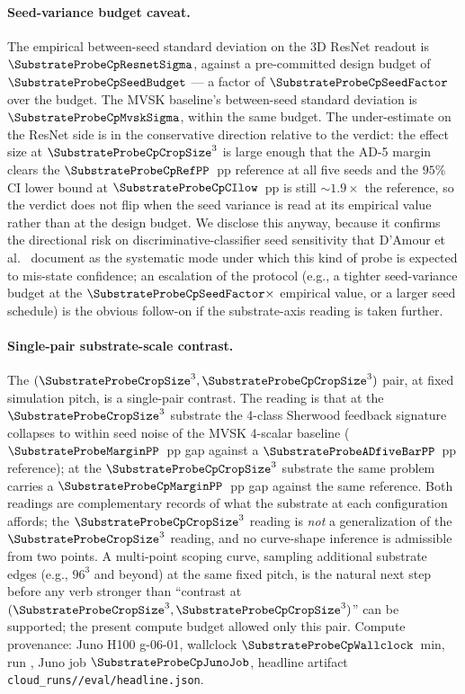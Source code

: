 \paragraph{Seed-variance budget caveat.}
The empirical between-seed standard deviation on the 3D ResNet readout is $\SubstrateProbeCpResnetSigma$, against a pre-committed design budget of $\SubstrateProbeCpSeedBudget$ --- a factor of $\SubstrateProbeCpSeedFactor$ over the budget. The MVSK baseline's between-seed standard deviation is $\SubstrateProbeCpMvskSigma$, within the same budget. The under-estimate on the ResNet side is in the conservative direction relative to the verdict: the effect size at $\SubstrateProbeCpCropSize^3$ is large enough that the AD-5 margin clears the $\SubstrateProbeCpRefPP$~pp reference at all five seeds and the $95\%$ CI lower bound at $\SubstrateProbeCpCIlow$~pp is still $\sim\!1.9\times$ the reference, so the verdict does not flip when the seed variance is read at its empirical value rather than at the design budget. We disclose this anyway, because it confirms the directional risk on discriminative-classifier seed sensitivity that D'Amour et al.~\cite{damour2020underspecification} document as the systematic mode under which this kind of probe is expected to mis-state confidence; an escalation of the protocol (e.g., a tighter seed-variance budget at the $\SubstrateProbeCpSeedFactor\times$ empirical value, or a larger seed schedule) is the obvious follow-on if the substrate-axis reading is taken further.

\paragraph{Single-pair substrate-scale contrast.}
The $(\SubstrateProbeCropSize^3, \SubstrateProbeCpCropSize^3)$ pair, at fixed simulation pitch, is a single-pair contrast. The reading is that at the $\SubstrateProbeCropSize^3$ substrate the 4-class Sherwood feedback signature collapses to within seed noise of the MVSK 4-scalar baseline ($\SubstrateProbeMarginPP$~pp gap against a $\SubstrateProbeADfiveBarPP$~pp reference); at the $\SubstrateProbeCpCropSize^3$ substrate the same problem carries a $\SubstrateProbeCpMarginPP$~pp gap against the same reference. Both readings are complementary records of what the substrate at each configuration affords; the $\SubstrateProbeCpCropSize^3$ reading is \emph{not} a generalization of the $\SubstrateProbeCropSize^3$ reading, and no curve-shape inference is admissible from two points. A multi-point scoping curve, sampling additional substrate edges (e.g., $96^3$ and beyond) at the same fixed pitch, is the natural next step before any verb stronger than ``contrast at $(\SubstrateProbeCropSize^3, \SubstrateProbeCpCropSize^3)$'' can be supported; the present compute budget allowed only this pair. Compute provenance: Juno H100 g-06-01, wallclock $\SubstrateProbeCpWallclock$~min, run \texttt{\SubstrateProbeCpRunId}, Juno job $\SubstrateProbeCpJunoJob$, headline artifact \texttt{cloud\_runs/\SubstrateProbeCpRunTag/eval/headline.json}.

